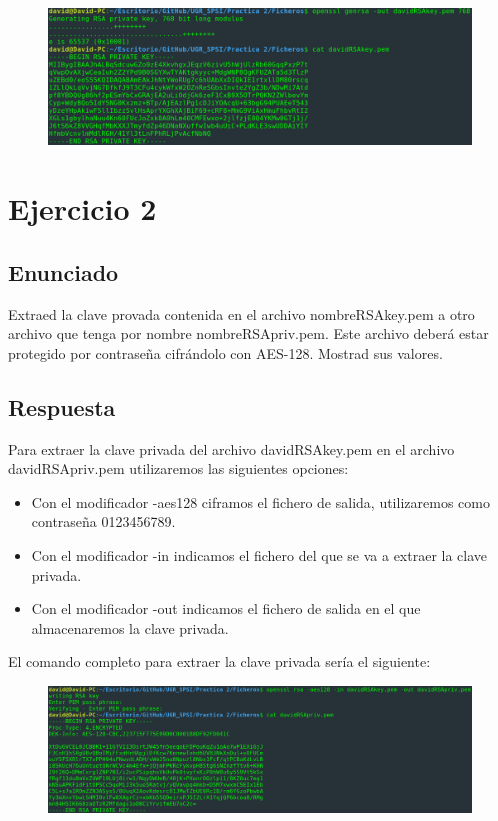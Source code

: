 \documentclass[10pt,a4paper,spanish]{report}
\begin{document}
\begin{figure}[!hbp]
 \centering  \includegraphics[width=1\textwidth]{./Imagenes/1.png}
\end{figure}


\chapter{Ejercicio 2}

\section{Enunciado}
\noindent
Extraed la clave provada contenida en el archivo nombreRSAkey.pem a otro archivo que tenga por nombre nombreRSApriv.pem. Este archivo deberá estar protegido por contraseña cifrándolo con AES-128. Mostrad sus valores.

\section{Respuesta}
\noindent
Para extraer la clave privada del archivo davidRSAkey.pem en el archivo davidRSApriv.pem utilizaremos las siguientes opciones:

\begin{itemize}
 \item Con el modificador -aes128 ciframos el fichero de salida, utilizaremos como contraseña 0123456789.
 \item Con el modificador -in indicamos el fichero del que se va a extraer la clave privada.
 \item Con el modificador -out indicamos el fichero de salida en el que almacenaremos la clave privada.
\end{itemize}

\noindent
El comando completo para extraer la clave privada sería el siguiente:

\begin{figure}[!hbp]
 \centering  \includegraphics[width=1\textwidth]{./Imagenes/2_0.png}
\end{figure}
\end{document}
